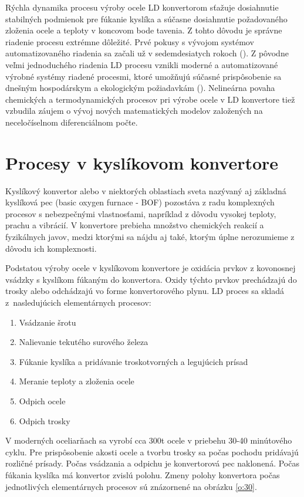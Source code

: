\documentclass[]{tukediphc}
\begin{document}
Rýchla dynamika procesu výroby ocele LD konvertorom sťažuje dosiahnutie stabilných podmienok pre fúkanie kyslíka a súčasne dosiahnutie požadovaného zloženia ocele a teploty v koncovom bode tavenia. Z tohto dôvodu je správne riadenie procesu extrémne dôležité. Prvé pokusy s vývojom systémov automatizovaného riadenia sa začali už v sedemdesiatych rokoch (\citep{Fritz2005}). Z pôvodne veľmi jednoduchého riadenia LD procesu vznikli moderné a automatizované výrobné systémy riadené procesmi, ktoré umožňujú súčasné prispôsobenie sa dnešným hospodárskym a ekologickým požiadavkám (\citep{Sarkar2015}). Nelineárna povaha chemických a termodynamických procesov pri výrobe ocele v LD konvertore tiež vzbudila záujem o vývoj nových matematických modelov založených na neceločíselnom diferenciálnom počte.

\section{Procesy v kyslíkovom konvertore}

Kyslíkový konvertor alebo v niektorých oblastiach sveta nazývaný aj základná kyslíková pec (basic oxygen furnace - BOF) pozostáva z radu komplexných procesov s nebezpečnými vlastnosťami, napríklad z dôvodu vysokej teploty, prachu a vibrácií. V konvertore prebieha  množstvo chemických reakcií a fyzikálnych javov, medzi ktorými sa nájdu aj také, ktorým úplne nerozumieme z dôvodu ich komplexnosti.

Podstatou výroby ocele v kyslíkovom konvertore je oxidácia prvkov z kovonosnej vsádzky s kyslíkom fúkaným do konvertora. Oxidy týchto prvkov prechádzajú do trosky alebo odchádzajú vo forme konvertorového plynu. LD proces sa skladá z~nasledujúcich elementárnych procesov:

\begin{enumerate}
	\item Vsádzanie šrotu
	\item Nalievanie tekutého surového železa
	\item Fúkanie kyslíka a pridávanie troskotvorných a legujúcich prísad
	\item Meranie teploty a zloženia ocele
	\item Odpich ocele
	\item Odpich trosky
\end{enumerate}

V moderných oceliarňach sa vyrobí cca 300t ocele v priebehu 30-40 minútového cyklu. Pre prispôsobenie akosti ocele a tvorbu trosky sa počas pochodu pridávajú rozličné prísady. Počas vsádzania a odpichu je konvertorová pec naklonená. Počas fúkania kyslíka má konvertor zvislú polohu. Zmeny polohy konvertora počas jednotlivých elementárnych procesov sú znázornené na obrázku \ref{o:30}.
\end{document}
